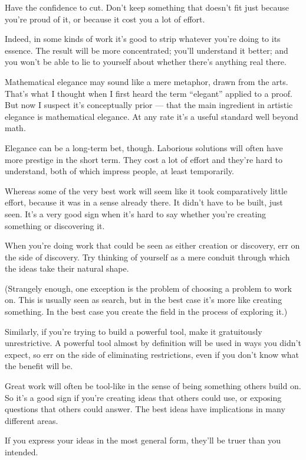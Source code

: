 Have the confidence to cut. Don't keep something that doesn't fit just
because you're proud of it, or because it cost you a lot of effort.

Indeed, in some kinds of work it's good to strip whatever you're doing
to its essence. The result will be more concentrated; you'll understand
it better; and you won't be able to lie to yourself about whether
there's anything real there.

Mathematical elegance may sound like a mere metaphor, drawn from the
arts. That's what I thought when I first heard the term ``elegant''
applied to a proof. But now I suspect it's conceptually prior --- that
the main ingredient in artistic elegance is mathematical elegance. At
any rate it's a useful standard well beyond math.

Elegance can be a long-term bet, though. Laborious solutions will often
have more prestige in the short term. They cost a lot of effort and
they're hard to understand, both of which impress people, at least
temporarily.

Whereas some of the very best work will seem like it took comparatively
little effort, because it was in a sense already there. It didn't have
to be built, just seen. It's a very good sign when it's hard to say
whether you're creating something or discovering it.

When you're doing work that could be seen as either creation or
discovery, err on the side of discovery. Try thinking of yourself as a
mere conduit through which the ideas take their natural shape.

(Strangely enough, one exception is the problem of choosing a problem to
work on. This is usually seen as search, but in the best case it's more
like creating something. In the best case you create the field in the
process of exploring it.)

Similarly, if you're trying to build a powerful tool, make it
gratuitously unrestrictive. A powerful tool almost by definition will be
used in ways you didn't expect, so err on the side of eliminating
restrictions, even if you don't know what the benefit will be.

Great work will often be tool-like in the sense of being something
others build on. So it's a good sign if you're creating ideas that
others could use, or exposing questions that others could answer. The
best ideas have implications in many different areas.

If you express your ideas in the most general form, they'll be truer
than you intended.

